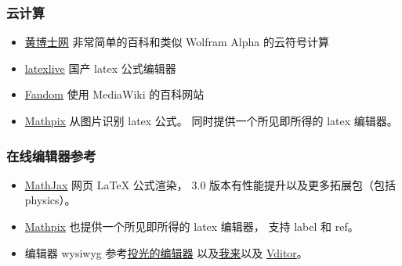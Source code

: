 \subsubsection{云计算}
\begin{itemize}
\item \href{http://www.drhuang.com/}{黄博士网} 非常简单的百科和类似 Wolfram Alpha 的云符号计算
\item \href{https://www.latexlive.com/}{latexlive} 国产 latex 公式编辑器
\item \href{https://harrypotter.fandom.com}{Fandom} 使用 MediaWiki 的百科网站
\item \href{https://mathpix.com}{Mathpix} 从图片识别 latex 公式。 同时提供一个所见即所得的 latex 编辑器。
\end{itemize}

\subsubsection{在线编辑器参考}
\begin{itemize}
\item \href{https://www.mathjax.org/}{MathJax} 网页 LaTeX 公式渲染， 3.0 版本有性能提升以及更多拓展包（包括 physics）。
\item \href{https://mathpix.com/ocr?gclid=CjwKCAiAy_CcBhBeEiwAcoMRHKnSPGjROmFGBj5R_Ev3hke7lG7xNIzKDHv5FgkMFq62aXRpISt_LhoC47YQAvD_BwE}{Mathpix} 也提供一个所见即所得的 latex 编辑器， 支持 label 和 ref。
\item 编辑器 wysiwyg 参考\href{https://editoe.com/}{投光的编辑器} 以及\href{https://www.wolai.com/}{我来}以及 \href{https://github.com/Vanessa219/vditor}{Vditor}。
\end{itemize}

